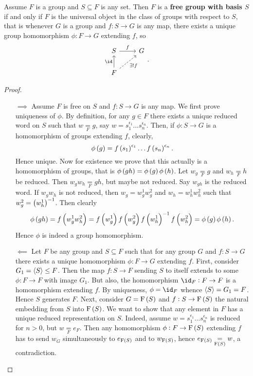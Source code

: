 \begin{proposition}
\label{prop:1.4.6}
Assume $ F $ is a group and $ S \subseteq F $ is any set. Then $ F $ is a \textbf{free group with basis $ S $} if and only if $ F $ is the universal object in the class of groups with respect to $ S $, that is whenever $ G $ is a group and $ f : S \to G $ is any map, there exists a unique group homomorphism $ \phi : F \to G $ extending $ f $, so
$$
\begin{tikzcd}
S \arrow{r}{f} & G \\
F \arrow{u}{\id} \arrow[dashed]{ur}[swap]{\exists !f} &
\end{tikzcd}.
$$
\end{proposition}

\begin{proof}
\hfill
\begin{itemize}
\item[$ \implies $] Assume $ F $ is free on $ S $ and $ f : S \to G $ is any map. We first prove uniqueness of $ \phi $. By definition, for any $ g \in F $ there exists a unique reduced word on $ S $ such that $ w \underset{F}{=} g $, say $ w = s_1^{\epsilon_1} \dots s_n^{\epsilon_n} $. Then, if $ \phi : S \to G $ is a homomorphism of groups extending $ f $, clearly,
$$ \phi\br{g} = f\br{s_1}^{\epsilon_1} \dots f\br{s_n}^{\epsilon_n}. $$
Hence unique. Now for existence we prove that this actually is a homomorphism of groups, that is $ \phi\br{gh} = \phi\br{g}\phi\br{h} $. Let $ w_g \underset{F}{=} g $ and $ w_h \underset{F}{=} h $ be reduced. Then $ w_gw_h \underset{F}{=} gh $, but maybe not reduced. Say $ w_{gh} $ is the reduced word. If $ w_gw_h $ is not reduced, then $ w_g = w_g^1w_g^2 $ and $ w_h = w_h^1w_h^2 $ such that $ w_g^2 = \br{w_h^1}^{-1} $. Then clearly
$$ \phi\br{gh} = f\br{w_g^1w_h^2} = f\br{w_g^1}f\br{w_g^2}f\br{w_h^1}^{-1}f\br{w_h^2} = \phi\br{g}\phi\br{h}. $$
Hence $ \phi $ is indeed a group homomorphism.

\pagebreak

\item[$ \impliedby $] Let $ F $ be any group and $ S \subseteq F $ such that for any group $ G $ and $ f : S \to G $ there exists a unique homomorphism $ \phi : F \to G $ extending $ f $. First, consider $ G_1 = \left\langle S \right\rangle \le F $. Then the map $ f : S \to F $ sending $ S $ to itself extends to some $ \phi : F \to F $ with image $ G_1 $. But also, the homomorphism $ \id_F : F \to F $ is a homomorphism extending $ f $. By uniqueness, $ \phi = \id_F $ whence $ \left\langle S \right\rangle = G_1 = F $. Hence $ S $ generates $ F $. Next, consider $ G = \F\br{S} $ and $ f : S \to \F\br{S} $ the natural embedding from $ S $ into $ \F\br{S} $. We want to show that any element in $ F $ has a unique reduced representation on $ S $. Indeed, assume $ w = s_1^{\epsilon_1} \dots s_n^{\epsilon_n} $ is reduced for $ n > 0 $, but $ w \underset{F}{=} e_F $. Then any homomorphism $ \phi : F \to \F\br{S} $ extending $ f $ has to send $ w_G $ simultaneously to $ e_{\F\br{S}} $ and to $ w_{\F\br{S}} $, hence $ e_{\F\br{S}} \underset{\F\br{S}}{=} w $, a contradiction.
\end{itemize}
\end{proof}

